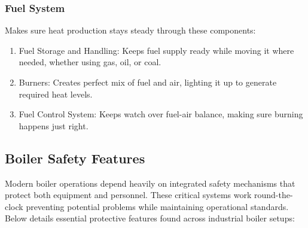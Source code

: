 \subsubsection{Fuel System}
Makes sure heat production stays steady through these components:
\begin{enumerate}
    \item Fuel Storage and Handling: Keeps fuel supply ready while moving it where needed, whether using gas, oil, or coal.
    \item Burners: Creates perfect mix of fuel and air, lighting it up to generate required heat levels.
    \item Fuel Control System: Keeps watch over fuel-air balance, making sure burning happens just right.
\end{enumerate}

\subsection{Boiler Safety Features}
Modern boiler operations depend heavily on integrated safety mechanisms that protect both equipment and personnel. These critical systems work round-the-clock preventing potential problems while maintaining operational standards. Below details essential protective features found across industrial boiler setups:


